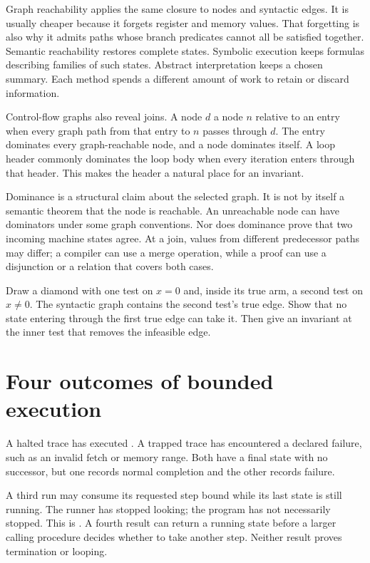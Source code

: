 Graph reachability applies the same closure to nodes and syntactic edges. It
is usually cheaper because it forgets register and memory values. That
forgetting is also why it admits paths whose branch predicates cannot all be
satisfied together. Semantic reachability restores complete states. Symbolic
execution keeps formulas describing families of such states. Abstract
interpretation keeps a chosen summary. Each method spends a different amount
of work to retain or discard information.

Control-flow graphs also reveal joins. A node \(d\)  a node
\(n\) relative to an entry when every graph path from that entry to \(n\)
passes through \(d\). The entry dominates every graph-reachable node, and a
node dominates itself. A loop header commonly dominates the loop body when
every iteration enters through that header. This makes the header a natural
place for an invariant.

Dominance is a structural claim about the selected graph. It is not by itself
a semantic theorem that the node is reachable. An unreachable node can have
dominators under some graph conventions. Nor does dominance prove that two
incoming machine states agree. At a join, values from different predecessor
paths may differ; a compiler can use a merge operation, while a proof can use
a disjunction or a relation that covers both cases.

\begin{tryit}[title={Graph path versus feasible path}]
Draw a diamond with one test on \(x=0\) and, inside its true arm, a second test
on \(x\neq 0\). The syntactic graph contains the second test's true edge.
Show that no state entering through the first true edge can take it. Then give
an invariant at the inner test that removes the infeasible edge.
\end{tryit}

\section{Four outcomes of bounded execution}

A halted trace has executed . A trapped trace has encountered a
declared failure, such as an invalid fetch or memory range. Both have a final
state with no successor, but one records normal completion and the other
records failure.

A third run may consume its requested step bound while its last state is still
running. The runner has stopped looking; the program has not necessarily
stopped. This is . A fourth result can return a
running state before a larger calling procedure decides whether to take
another step. Neither result proves termination or looping.

